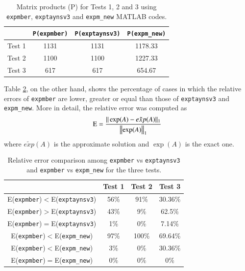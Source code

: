 \begin{table}[!t]\begin{center}
        \caption{Matrix products (P) for  Tests 1, 2 and 3 using \texttt{expmber}, \texttt{exptaynsv3}
and \texttt{expm\_new} MATLAB codes.}
{\small
        \begin{tabular}{|c||c|c|c|}\hline&\texttt{P(expmber)}&\texttt{P(exptaynsv3)}&\texttt{P(expm\_new)}\\\hline
            Test 1 & 1131 & 1131 & 1178.33 \\\hline
            Test 2 & 1100 & 1100 & 1227.33 \\\hline
            Test 3 & 617  & 617  & 654.67 \\\hline
        \end{tabular}
}
        \label{table_prod_comparative}
    \end{center}
\end{table} 

Table \ref{table_err_comparative}, on the other hand, shows the percentage of cases in which the relative errors of \texttt{expmber} are lower, greater or equal than those of \texttt{exptaynsv3} and \texttt{expm\_new}. More in detail, the relative error was computed as
$$
\textmd{E}=\frac{\| \exp(A)-\tilde {exp}(A)\|_1}{\left\Vert
\exp(A)\right\Vert_1}
$$where $\tilde {exp}(A)$ is the approximate solution and $\exp(A)$ is the exact one.    

\begin{table}[!t]\begin{center}
                \caption{Relative error comparison among  \texttt{expmber}
vs  \texttt{exptaynsv3} and  \texttt{expmber}
vs  \texttt{expm\_new} for the three tests.}
{\small

               \begin{tabular}{|c||c|c|c|}\hline & Test 1  &Test 2 & Test 3\\\hline
                        E(\texttt{expmber})$<$E(\texttt{exptaynsv3})     & 56\% &  91\% & 30.36\%\\\hline
                        E(\texttt{expmber})$>$E(\texttt{exptaynsv3})     & 43\% &   9\%  & 62.5\%\\\hline
                        E(\texttt{expmber})$=$E(\texttt{exptaynsv3})     &  1\%  &   0\%  & 7.14\%\\\hline
                        E(\texttt{expmber})$<$E(\texttt{expm\_new})    & 97\% & 100\% & 69.64\%\\\hline
                        E(\texttt{expmber})$<$E(\texttt{expm\_new})    &   3\% &    0\% & 30.36\%\\\hline
                        E(\texttt{expmber})$=$E(\texttt{expm\_new})    &   0\% &    0\% &       0\%\\\hline
                \end{tabular}
}
                \label{table_err_comparative}
        \end{center}
\end{table}

